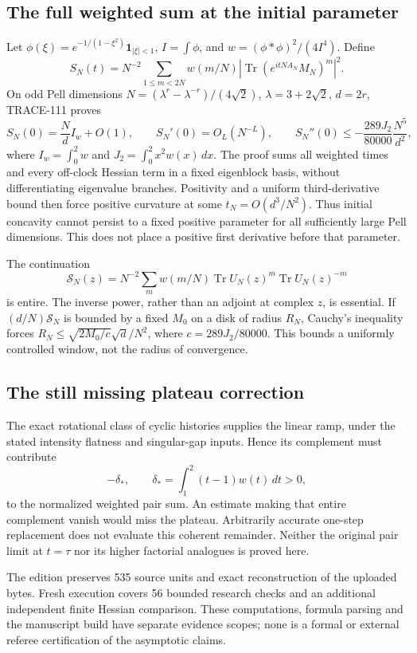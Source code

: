\subsection{The full weighted sum at the initial parameter}
Let $\phi(\xi)=e^{-1/(1-\xi^2)}\mathbf1_{|\xi|<1}$,
$I=\int\phi$, and $w=(\phi*\phi)^2/(4I^4)$. Define
\[
S_N(t)=N^{-2}\sum_{1\le m<2N}w(m/N)
|\operatorname{Tr}(e^{itNA_N}M_N)^m|^2.
\]
On odd Pell dimensions $N=(\lambda^r-\lambda^{-r})/(4\sqrt2)$,
$\lambda=3+2\sqrt2$, $d=2r$, TRACE-111 proves
\[
S_N(0)=\frac Nd I_w+O(1),\qquad S_N'(0)=O_L(N^{-L}),\qquad
S_N''(0)\le-\frac{289J_2}{80000}\frac{N^5}{d^2},
\]
where $I_w=\int_0^2w$ and $J_2=\int_0^2x^2w(x)\,dx$.
The proof sums all weighted times and every off-clock Hessian term in a
fixed eigenblock basis, without differentiating eigenvalue branches.
Positivity and a uniform third-derivative bound then force positive
curvature at some $t_N=O(d^3/N^2)$. Thus initial concavity cannot persist
to a fixed positive parameter for all sufficiently large Pell dimensions.
This does not place a positive first derivative before that parameter.

The continuation
\[
\mathcal S_N(z)=N^{-2}\sum_mw(m/N)
\operatorname{Tr}U_N(z)^m\operatorname{Tr}U_N(z)^{-m}
\]
is entire. The inverse power, rather than an adjoint at complex $z$, is
essential. If $(d/N)\mathcal S_N$ is bounded by a fixed $M_0$ on a disk
of radius $R_N$, Cauchy's inequality forces
$R_N\le\sqrt{2M_0/c}\sqrt d/N^2$, where $c=289J_2/80000$.
This bounds a uniformly controlled window, not the radius of convergence.

\subsection{The still missing plateau correction}
The exact rotational class of cyclic histories supplies the linear ramp,
under the stated intensity flatness and singular-gap inputs. Hence its
complement must contribute
\[
-\delta_*,\qquad \delta_*=\int_1^2(t-1)w(t)\,dt>0,
\]
to the normalized weighted pair sum. An estimate making that entire
complement vanish would miss the plateau. Arbitrarily accurate one-step
replacement does not evaluate this coherent remainder. Neither the original
pair limit at $t=\tau$ nor its higher factorial analogues is proved here.

The edition preserves 535 source units and exact reconstruction of the
uploaded bytes. Fresh execution covers 56 bounded research checks and an
additional independent finite Hessian comparison. These computations,
formula parsing and the manuscript build have separate evidence scopes;
none is a formal or external referee certification of the asymptotic claims.

